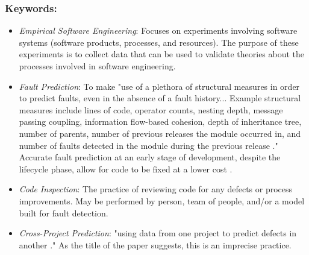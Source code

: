 \documentclass{sig-alternate-05-2015}
\begin{document}
\subsubsection{Keywords:}
\begin{itemize}
\item \emph{Empirical Software Engineering}: Focuses on experiments involving software systems (software products, processes, and resources). The purpose of these experiments is to collect data that can be used to validate theories about the processes involved in software engineering.
\item \emph{Fault Prediction}: To make "use of a plethora of structural measures in order to predict faults, even in the absence of a fault history... Example structural measures include lines of code, operator counts, nesting depth, message passing coupling, information flow-based cohesion, depth of inheritance tree, number of parents, number of previous releases the module occurred in, and number of faults detected in the module during the previous release \cite{Binkley:2007}." Accurate fault prediction at an early stage of development, despite the lifecycle phase, allow for code to be fixed at a lower cost \cite{Binkley:2007}.
\item \emph{Code Inspection}: The practice of reviewing code for any defects or process improvements. May be performed by person, team of people, and/or a model built for fault detection.
\item \emph{Cross-Project Prediction}: "using data from one project to predict defects in another \cite{Rahman:2012}." As the title of the paper suggests, this is an imprecise practice.
\end{itemize} 
\end{document}
